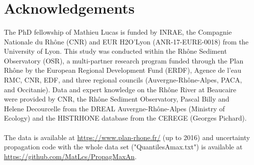 \documentclass[11pt]{article}
\begin{document}
\section{Acknowledgements}
\paragraph{}
The PhD fellowship of Mathieu Lucas is funded by INRAE, the Compagnie Nationale du Rhône (CNR) and EUR H2O’Lyon (ANR-17-EURE-0018) from the University of Lyon. This study was conducted within the Rhône Sediment Observatory (OSR), a multi-partner research program funded through the Plan Rhône by the European Regional Development Fund (ERDF), Agence de l'eau RMC, CNR, EDF, and three regional councils (Auvergne-Rhône-Alpes, PACA, and Occitanie). Data and expert knowledge on the Rhône River at Beaucaire were provided by CNR, the Rhône Sediment Observatory, Pascal Billy and Helene Decourcelle from the DREAL Auvergne-Rhône-Alpes (Ministry of Ecology) and the HISTRHONE database from the CEREGE (Georges Pichard).
\paragraph{} The data is available at \href{https://www.plan-rhone.fr/publications-131/actualisation-de-lhydrologie-des-crues-du-rhone-1865.html?cHash=5628938abe287dc9ca390dad7373ae0e}{https://www.plan-rhone.fr/} (up to 2016) and uncertainty propagation code with the whole data set ("QuantilesAmax.txt") is available at \url{https://github.com/MatLcs/PropagMaxAn}.

\newpage

\printbibliography
\end{document}
